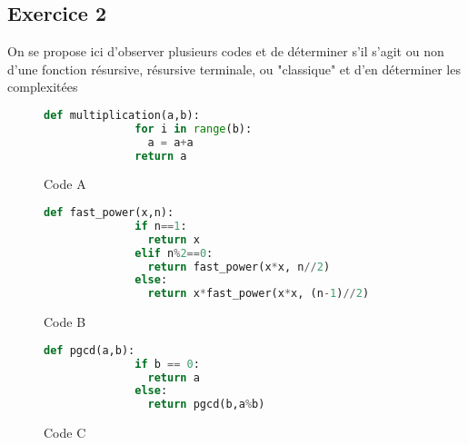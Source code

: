 \documentclass[hidelinks]{article}
\begin{document}
    \subsection{Exercice 2}
    On se propose ici d'observer plusieurs codes et de déterminer s'il s'agit ou non d'une fonction résursive, résursive terminale, ou "classique"
    et d'en déterminer les complexitées
    \begin{figure}[H]
        \begin{lstlisting}[language=Python]
            def multiplication(a,b):
              for i in range(b):
                a = a+a
              return a
        \end{lstlisting}
        \caption{Code A}
    \end{figure}
    \begin{figure}[H]
        \begin{lstlisting}[language=Python]
            def fast_power(x,n):
              if n==1:
                return x
              elif n%2==0:
                return fast_power(x*x, n//2)
              else:
                return x*fast_power(x*x, (n-1)//2)
        \end{lstlisting}
        \caption{Code B}
    \end{figure}
    \begin{figure}[H]
        \begin{lstlisting}[language=Python]
            def pgcd(a,b):
              if b == 0:
                return a
              else:
                return pgcd(b,a%b)
        \end{lstlisting}
        \caption{Code C}
    \end{figure}
\end{document}
